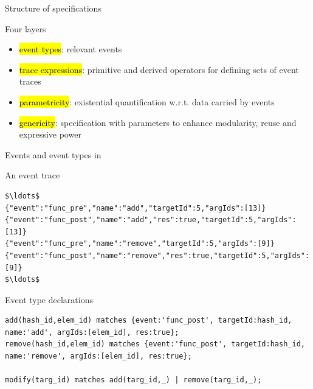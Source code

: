 \documentclass[10pt,usenames,dvipsnames]{beamer}
\begin{document}
\begin{frame}{Structure of \rml specifications}
  \begin{block}{Four layers}
    \begin{itemize}
    \item \hl{event types}: relevant events 
    \item \hl{trace expressions}: primitive and derived operators for defining sets of event traces
    \item \hl{parametricity}: existential quantification w.r.t. data carried by events
    \item \hl{genericity}: specification with parameters to enhance modularity, reuse and expressive power
    \end{itemize}
  \end{block}
\end{frame}


\begin{frame}[fragile]{Events and event types in \rml}
  \begin{block}{An event trace}
    \begin{lstlisting}[basicstyle=\ttfamily\scriptsize]
$\ldots$
{"event":"func_pre","name":"add","targetId":5,"argIds":[13]}      
{"event":"func_post","name":"add","res":true,"targetId":5,"argIds":[13]}
{"event":"func_pre","name":"remove","targetId":5,"argIds":[9]}
{"event":"func_post","name":"remove","res":true,"targetId":5,"argIds":[9]}
$\ldots$
    \end{lstlisting}
  \end{block}

  \begin{block}{Event type declarations}
    \begin{lstlisting}[basicstyle=\ttfamily\scriptsize]
add(hash_id,elem_id) matches {event:'func_post', targetId:hash_id, name:'add', argIds:[elem_id], res:true};
remove(hash_id,elem_id) matches {event:'func_post', targetId:hash_id, name:'remove', argIds:[elem_id], res:true};

modify(targ_id) matches add(targ_id,_) | remove(targ_id,_);
    \end{lstlisting}
  \end{block}
\end{frame}
\end{document}
